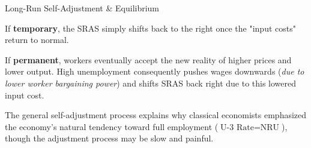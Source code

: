 \documentclass[10pt]{article}
\begin{document}
\begin{core}{Long-Run Self-Adjustment \& Equilibrium}
\begin{enumerate}
        If \textbf{temporary}, the SRAS simply shifts back to the right once the "input costs" return to normal.

        If \textbf{permanent}, workers eventually accept the new reality of higher prices and lower output. High unemployment consequently pushes wages downwards (\textit{due to lower worker bargaining power}) and shifts SRAS back right due to this lowered input cost.


      \end{enumerate}

      The general self-adjustment process explains why classical economists emphasized the economy's natural tendency toward full employment ($\text{U-3 Rate} = \text{NRU}$), though the adjustment process may be slow and painful.

    \end{core}
\end{document}
